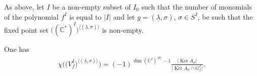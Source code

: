 As above, let $I$ be a non-empty subset of $I_0$ such that the number of monomials of the polynomial $f^I$ is equal
to $|I|$ and let $g=(\underline{\lambda}, \sigma)$, $\sigma \in S^I$, be such that the fixed point set
$\big(({\mathbb C}^*)^I\big)^{\langle (\underline{\lambda}, \sigma) \rangle}$ is non-empty.

\begin{Proposition} \label{prop:Euler} One has
\begin{gather} \label{eq:Euler}
\chi\big(\big(V_f^I\big)^{\langle (\underline{\lambda}, \sigma) \rangle}\big) =
(-1)^{\dim \left({\mathbb C}^I\right)^{\langle \sigma \rangle} -1} \frac{|\operatorname{Ker} A_\sigma|}{\big|\operatorname{Ker} A_\sigma \cap G_f^I\big|}.
\end{gather}
\end{Proposition}

